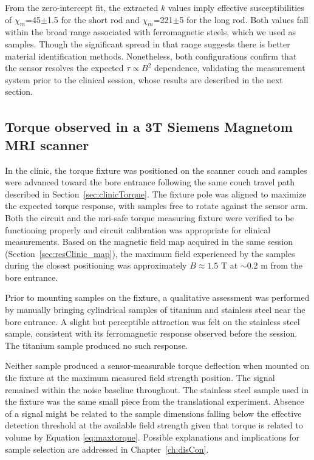 From the zero-intercept fit, the extracted $k$ values imply effective susceptibilities of $\chi_m$=45$\pm$1.5 for the short rod and $\chi_m$=221$\pm$5 for the long rod. Both values fall within the broad range associated with ferromagnetic steels, which we used as samples. Though the significant spread in that range suggests there is better material identification methods. Nonetheless, both configurations confirm that the sensor resolves the expected $\tau \propto B^2$ dependence, validating the measurement system prior to the clinical session, whose results are described in the next section.

\FloatBarrier

\subsection{Torque observed in a 3T Siemens Magnetom\textsuperscript{\texttrademark} MRI scanner}

In the clinic, the torque fixture was positioned on the scanner couch and samples were advanced toward the bore entrance following the same couch travel path described in Section~\ref{sec:clinicTorque}. The fixture pole was aligned to maximize the expected torque response, with samples free to rotate against the sensor arm. Both the circuit and the \gls{mri}-safe torque measuring fixture were verified to be functioning properly and circuit calibration was appropriate for clinical measurements. Based on the magnetic field map acquired in the same session (Section~\ref{sec:resClinic_map}), the maximum field experienced by the samples during the closest positioning was approximately $B \approx 1.5$ T at $\sim$0.2 m from the bore entrance.

Prior to mounting samples on the fixture, a qualitative assessment was performed by manually bringing cylindrical samples of titanium and stainless steel near the bore entrance. A slight but perceptible attraction was felt on the stainless steel sample, consistent with its ferromagnetic response observed before the session. The titanium sample produced no such response.

Neither sample produced a sensor-measurable torque deflection when mounted on the fixture at the maximum measured field strength position. The signal remained within the noise baseline throughout. The stainless steel sample used in the fixture was the same small piece from the translational experiment. Absence of a signal might be related to the sample dimensions falling below the effective detection threshold at the available field strength given that torque is related to volume by Equation \ref{eq:maxtorque}. Possible explanations and implications for sample selection are addressed in Chapter~\ref{ch:disCon}.

\FloatBarrier